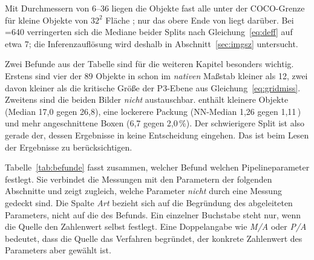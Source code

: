 Mit Durchmessern von 6--36\px{} liegen die Objekte fast alle unter der
COCO-Grenze für kleine Objekte von $32^2$\px{} Fläche \parencite{lin2014coco};
nur das obere Ende von  liegt darüber. Bei =640
verringerten sich die Mediane beider Splits nach Gleichung~\eqref{eq:deff} auf etwa
7\px; die Inferenzauflösung wird deshalb in Abschnitt~\ref{sec:imgsz}
untersucht.

Zwei Befunde aus der Tabelle sind für die weiteren Kapitel besonders wichtig.
Erstens sind vier der 89 Objekte in  schon im \emph{nativen} Maßstab
kleiner als 12\px, zwei davon kleiner als die kritische Größe der P3-Ebene aus
Gleichung~\eqref{eq:gridmiss}. Zweitens sind die beiden Bilder
\emph{nicht} austauschbar.  enthält kleinere Objekte (Median 17,0
gegen 26,8\px), eine lockerere Packung (NN-Median 1,26 gegen 1,11\,\Oe) und
mehr angeschnittene Boxen (6,7 gegen 2,0\,\%). Der schwierigere Split ist also
gerade der, dessen Ergebnisse in keine Entscheidung eingehen. Das ist beim Lesen der
Ergebnisse zu berücksichtigen.

\label{sec:messungmapping} Tabelle~\ref{tab:befunde} fasst
zusammen, welcher Befund welchen Pipelineparameter festlegt. Sie verbindet die
Messungen mit den Parametern der folgenden Abschnitte und zeigt zugleich,
welche Parameter \emph{nicht} durch eine Messung gedeckt sind. Die Spalte
\emph{Art} bezieht sich auf die Begründung des abgeleiteten Parameters, nicht
auf die des Befunds. Ein einzelner Buchstabe steht nur, wenn die Quelle den
Zahlenwert selbst festlegt. Eine Doppelangabe wie \emph{M/A} oder \emph{P/A}
bedeutet, dass die Quelle das Verfahren begründet, der konkrete Zahlenwert des
Parameters aber gewählt ist.

